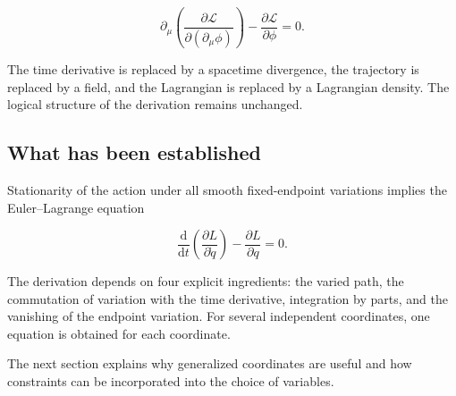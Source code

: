 \[
\partial_{\mu}
\left(
\frac{\partial\mathcal{L}}
{\partial(\partial_{\mu}\phi)}
\right)
-
\frac{\partial\mathcal{L}}{\partial\phi}
=0.
\]

The time derivative is replaced by a spacetime divergence, the trajectory is replaced by a field, and the Lagrangian is replaced by a Lagrangian density. The logical structure of the derivation remains unchanged.

\subsection{What has been established}

Stationarity of the action under all smooth fixed-endpoint variations implies the Euler--Lagrange equation

\[
\frac{\mathrm{d}}{\mathrm{d}t}
\left(
\frac{\partial L}{\partial\dot q}
\right)
-
\frac{\partial L}{\partial q}
=0.
\]

The derivation depends on four explicit ingredients: the varied path, the commutation of variation with the time derivative, integration by parts, and the vanishing of the endpoint variation. For several independent coordinates, one equation is obtained for each coordinate.

The next section explains why generalized coordinates are useful and how constraints can be incorporated into the choice of variables.